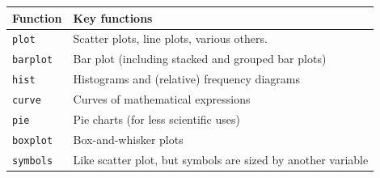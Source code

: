 \documentclass[]{book}
\begin{document}
\begin{longtable}[]{@{}ll@{}}
\toprule
\begin{minipage}[b]{0.21\columnwidth}\raggedright
Function\strut
\end{minipage} & \begin{minipage}[b]{0.73\columnwidth}\raggedright
Key functions\strut
\end{minipage}\tabularnewline
\midrule
\endhead
\begin{minipage}[t]{0.21\columnwidth}\raggedright
\texttt{plot}\strut
\end{minipage} & \begin{minipage}[t]{0.73\columnwidth}\raggedright
Scatter plots, line plots, various others.\strut
\end{minipage}\tabularnewline
\begin{minipage}[t]{0.21\columnwidth}\raggedright
\texttt{barplot}\strut
\end{minipage} & \begin{minipage}[t]{0.73\columnwidth}\raggedright
Bar plot (including stacked and grouped bar plots)\strut
\end{minipage}\tabularnewline
\begin{minipage}[t]{0.21\columnwidth}\raggedright
\texttt{hist}\strut
\end{minipage} & \begin{minipage}[t]{0.73\columnwidth}\raggedright
Histograms and (relative) frequency diagrams\strut
\end{minipage}\tabularnewline
\begin{minipage}[t]{0.21\columnwidth}\raggedright
\texttt{curve}\strut
\end{minipage} & \begin{minipage}[t]{0.73\columnwidth}\raggedright
Curves of mathematical expressions\strut
\end{minipage}\tabularnewline
\begin{minipage}[t]{0.21\columnwidth}\raggedright
\texttt{pie}\strut
\end{minipage} & \begin{minipage}[t]{0.73\columnwidth}\raggedright
Pie charts (for less scientific uses)\strut
\end{minipage}\tabularnewline
\begin{minipage}[t]{0.21\columnwidth}\raggedright
\texttt{boxplot}\strut
\end{minipage} & \begin{minipage}[t]{0.73\columnwidth}\raggedright
Box-and-whisker plots\strut
\end{minipage}\tabularnewline
\begin{minipage}[t]{0.21\columnwidth}\raggedright
\texttt{symbols}\strut
\end{minipage} & \begin{minipage}[t]{0.73\columnwidth}\raggedright
Like scatter plot, but symbols are sized by another variable\strut
\end{minipage}\tabularnewline
\bottomrule
\end{longtable}
\end{document}
